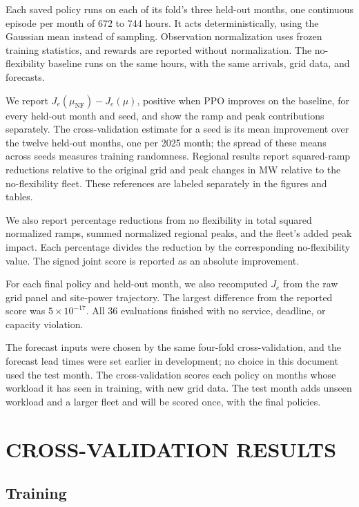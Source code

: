 \documentclass{UNCC-thesis}
\begin{document}
Each saved policy runs on each of its fold's three held-out months, one
continuous episode per month of 672 to 744 hours. It acts deterministically,
using the Gaussian mean instead of sampling. Observation normalization uses
frozen training statistics, and rewards are reported without normalization.
The no-flexibility baseline runs on the same hours, with the same arrivals,
grid data, and forecasts.

We report \(J_e(\mu_{\mathrm{NF}})-J_e(\mu)\), positive when PPO improves on
the baseline, for every held-out month and seed, and show the ramp and peak
contributions separately. The cross-validation estimate for a seed is its
mean improvement over the twelve held-out months, one per 2025 month; the
spread of these means across seeds measures training randomness. Regional
results report squared-ramp reductions relative to the original grid and
peak changes in MW relative to the no-flexibility fleet. These references
are labeled separately in the figures and tables.

We also report percentage reductions from no flexibility in total squared
normalized ramps, summed normalized regional peaks, and the fleet's added
peak impact. Each percentage divides the reduction by the corresponding
no-flexibility value. The signed joint score is reported as an absolute
improvement.

For each final policy and held-out month, we also recomputed \(J_e\) from the
raw grid panel and site-power trajectory. The largest difference from the
reported score was \(5\times10^{-17}\). All 36 evaluations finished with no
service, deadline, or capacity violation.

The forecast inputs were chosen by the same four-fold cross-validation, and
the forecast lead times were set earlier in development; no choice in this
document used the test month. The cross-validation scores each policy on
months whose workload it has seen in training, with new grid data. The test
month adds unseen workload and a larger fleet and will be scored once, with
the final policies.

\chapter{CROSS-VALIDATION RESULTS}
\label{sec:results}

\section{Training}
\end{document}
